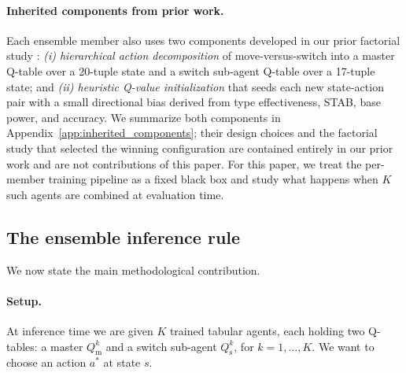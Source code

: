 \paragraph{Inherited components from prior work.}
Each ensemble member also uses two components developed in our prior
factorial study \citep{singh2026v5}:
\emph{(i) hierarchical action decomposition} of move-versus-switch into a
master Q-table over a 20-tuple state and a switch sub-agent Q-table over
a 17-tuple state; and \emph{(ii) heuristic Q-value initialization} that
seeds each new state-action pair with a small directional bias derived from
type effectiveness, STAB, base power, and accuracy. We summarize both
components in Appendix~\ref{app:inherited_components}; their design choices
and the factorial study that selected the winning configuration are
contained entirely in our prior work and are not contributions of this
paper. For this paper, we treat the per-member training pipeline as a
fixed black box and study what happens when $K$ such agents are combined
at evaluation time.

\subsection{The ensemble inference rule}
\label{sec:method_inference}

We now state the main methodological contribution.

\paragraph{Setup.}
At inference time we are given $K$ trained tabular agents, each holding
two Q-tables: a master $Q^k_{\text{m}}$ and a switch sub-agent
$Q^k_{\text{s}}$, for $k = 1, \ldots, K$. We want to choose an action
$a^*$ at state $s$.

